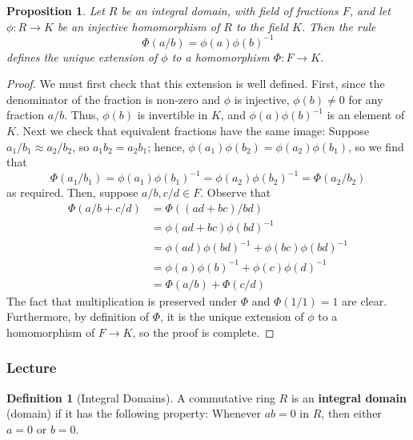 \documentclass[12pt]{article}
\newtheorem{prop}[thm]{Proposition}
\theoremstyle{definition}
\newtheorem{defn}[thm]{Definition}
\theoremstyle{remark}
\numberwithin{equation}{section}
\newcommand\B[1]{\textbf{ #1}}
\begin{document}
\begin{prop}
        Let $R$ be an integral domain, with field of fractions $F$, and let $\phi:R\rightarrow K$ be an injective homomorphism of $R$ to the field $K$. Then the rule \begin{equation}
                \Phi(a/b) = \phi(a)\phi(b)^{-1}
        \end{equation}
        defines the unique extension of $\phi$ to a homomorphism $\Phi:F\rightarrow K$.
\end{prop}
\begin{proof}
        We must first check that this extension is well defined. First, since the denominator of the fraction is non-zero and $\phi$ is injective, $\phi(b) \neq 0$ for any fraction $a/b$. Thus, $\phi(b)$ is invertible in $K$, and $\phi(a)\phi(b)^{-1}$ is an element of $K$. Next we check that equivalent fractions have the same image: Suppose $a_1/b_1 \approx a_2/b_2$, so $a_1b_2 = a_2b_1$; hence, $\phi(a_1)\phi(b_2) = \phi(a_2)\phi(b_1)$, so we find that \begin{equation}
                \Phi(a_1/b_1) = \phi(a_1)\phi(b_1)^{-1} = \phi(a_2)\phi(b_2)^{-1} = \Phi(a_2/b_2)
        \end{equation}
        as required. Then, suppose $a/b,c/d \in F$. Observe that \begin{align*}
                \Phi(a/b+c/d) &= \Phi((ad+bc)/bd)\\
                &= \phi(ad+bc)\phi(bd)^{-1} \\
                &= \phi(ad)\phi(bd)^{-1}+\phi(bc)\phi(bd)^{-1} \\
                &= \phi(a)\phi(b)^{-1} + \phi(c)\phi(d)^{-1} \\
                &= \Phi(a/b) + \Phi(c/d)
        \end{align*}
        The fact that multiplication is preserved under $\Phi$ and $\Phi(1/1) = 1$ are clear. Furthermore, by definition of $\Phi$, it is the unique extension of $\phi$ to a homomorphism of $F\rightarrow K$, so the proof is complete.
\end{proof}

\vspace{15pt}


\subsubsection{Lecture}

\begin{defn}[Integral Domains]
        A commutative ring $R$ is an \B{integral domain} (domain) if it has the following property: Whenever $ab = 0$ in $R$, then either $a =0$ or $b = 0$.
\end{defn}
\end{document}
